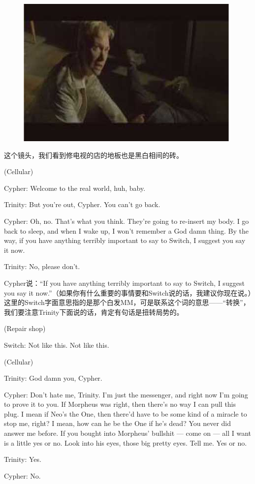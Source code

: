 \documentclass[UTF8]{ctexart}
\newenvironment{myquote}{\color{green} \setlength{\leftskip}{6em} \setlength{\rightskip}{4em} \setlength{\parindent}{-2em}}{\par}
\begin{document}
\begin{figure}[htb]
\centering
\includegraphics[width=0.5\linewidth]{fig/read_Matrix-59}
\end{figure}

这个镜头，我们看到修电视的店的地板也是黑白相间的砖。

\begin{myquote}
(Cellular)

Cypher: Welcome to the real world, huh, baby.

Trinity: But you're out, Cypher. You can't go back.

Cypher: Oh, no. That's what you think. They're going to re-insert my body. I go back to sleep, and when I wake up, I won't remember a God damn thing. By the way, if you have anything terribly important to say to Switch, I suggest you say it now.

Trinity: No, please don't.
\end{myquote}

Cypher说：“If you have anything terribly important to say to Switch, I suggest you say it now.”（如果你有什么重要的事情要和Switch说的话，我建议你现在说。）这里的Switch字面意思指的是那个白发MM，可是联系这个词的意思——“转换”，我们要注意Trinity下面说的话，肯定有句话是扭转局势的。

\begin{myquote}
(Repair shop)

Switch: Not like this. Not like this.

(Cellular)

Trinity: God damn you, Cypher.

Cypher: Don't hate me, Trinity. I'm just the messenger, and right now I'm going to prove it to you. If Morpheus was right, then there's no way I can pull this plug. I mean if Neo's the One, then there'd have to be some kind of a miracle to stop me, right? I mean, how can he be the One if he's dead? You never did answer me before. If you bought into Morpheus' bullshit --- come on --- all I want is a little yes or no. Look into his eyes, those big pretty eyes. Tell me. Yes or no.

Trinity: Yes.

Cypher: No.
\end{myquote}
\end{document}

